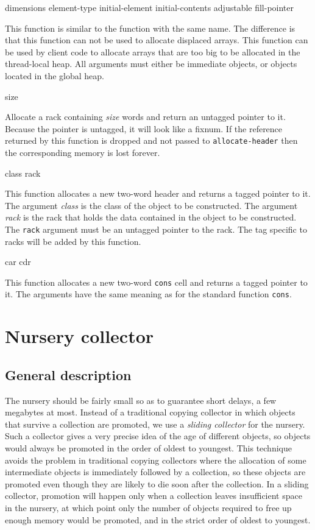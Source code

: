  {dimensions \key element-type initial-element
  initial-contents adjustable fill-pointer}

This function is similar to the \commonlisp{} function with the same
name.  The difference is that this function can not be used to
allocate displaced arrays.  This function can be used by client code
to allocate arrays that are too big to be allocated in the
thread-local heap.  All arguments must either be immediate objects, or
objects located in the global heap.

 {size}

Allocate a rack containing \textit{size} words and return an untagged
pointer to it.  Because the pointer is untagged, it will look like a
fixnum.  If the reference returned by this function is dropped and not
passed to \texttt{allocate-header} then the corresponding memory is
lost forever.

 {class rack}

This function allocates a new two-word header and returns a tagged
pointer to it.  The argument \textit{class} is the class of the object
to be constructed.  The argument \textit{rack} is the rack that holds
the data contained in the object to be constructed.  The \texttt{rack}
argument must be an untagged pointer to the rack.  The tag specific to
racks will be added by this function.

 {car cdr}

This function allocates a new two-word \texttt{cons} cell and returns
a tagged pointer to it.  The arguments have the same meaning as for
the standard \commonlisp{} function \texttt{cons}.

\section{Nursery collector}

\subsection{General description}

The nursery should be fairly small so as to guarantee short delays, a
few megabytes at most.  Instead of a traditional copying collector in
which objects that survive a collection are promoted, we use a
\emph{sliding collector} for the nursery.  Such a collector gives a
very precise idea of the age of different objects, so objects would
always be promoted in the order of oldest to youngest.  This
technique avoids the problem in traditional copying collectors where
the allocation of some intermediate objects is immediately followed by
a collection, so these objects are promoted even though they are
likely to die soon after the collection.  In a sliding collector,
promotion will happen only when a collection leaves insufficient space
in the nursery, at which point only the number of objects required to
free up enough memory would be promoted, and in the strict order of
oldest to youngest.

